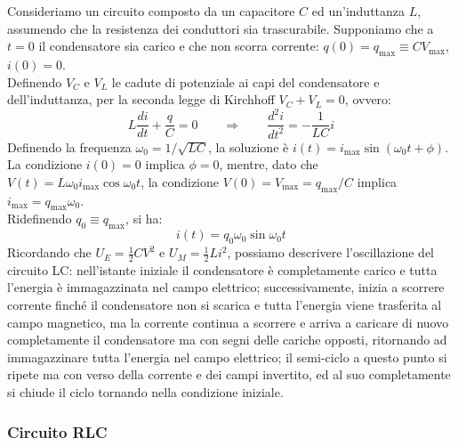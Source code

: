\documentclass[]{article}
\begin{document}
Consideriamo un circuito composto da un capacitore $ C $ ed un'induttanza $ L $, assumendo che la resistenza dei conduttori sia trascurabile. Supponiamo che a $ t = 0 $ il condensatore sia carico e che non scorra corrente: $ q(0) = q_{\text{max}} \equiv C V_{\text{max}} $, $ i(0) = 0 $. \\ 
%
Definendo $ V_C $ e $ V_L $ le cadute di potenziale ai capi del condensatore e dell'induttanza, per la seconda legge di Kirchhoff $ V_C + V_L = 0 $, ovvero:
\begin{equation}
	L \frac{di}{dt} + \frac{q}{C} = 0 \qquad\Longrightarrow\qquad \frac{d^2 i}{dt^2} = -\frac{1}{LC} i
	\label{eq:41}
\end{equation}
Definendo la frequenza $ \omega_0 = 1 / \sqrt{LC} $, la soluzione è $ i(t) = i_{\text{max}} \sin(\omega_0 t + \phi) $. La condizione $ i(0) = 0 $ implica $ \phi = 0 $, mentre, dato che $ V(t) = L \omega_0 i_{\text{max}} \cos\omega_0 t $, la condizione $ V(0) = V_{\text{max}} = q_{\text{max}} / C $ implica $ i_{\text{max}} = q_{\text{max}}\omega_0 $. \\ 
%
Ridefinendo $ q_0 \equiv q_{\text{max}} $, si ha:
\begin{equation}
	i(t) = q_0 \omega_0 \sin\omega_0 t
	\label{eq:42}
\end{equation}
Ricordando che $ U_E = \frac{1}{2} CV^2 $ e $ U_M = \frac{1}{2} Li^2 $, possiamo descrivere l'oscillazione del circuito LC: nell'istante iniziale il condensatore è completamente carico e tutta l'energia è immagazzinata nel campo elettrico; successivamente, inizia a scorrere corrente finché il condensatore non si scarica e tutta l'energia viene trasferita al campo magnetico, ma la corrente continua a scorrere e arriva a caricare di nuovo completamente il condensatore ma con segni delle cariche opposti, ritornando ad immagazzinare tutta l'energia nel campo elettrico; il semi-ciclo a questo punto si ripete ma con verso della corrente e dei campi invertito, ed al suo completamente si chiude il ciclo tornando nella condizione iniziale.

\subsubsection{Circuito RLC}
\end{document}
